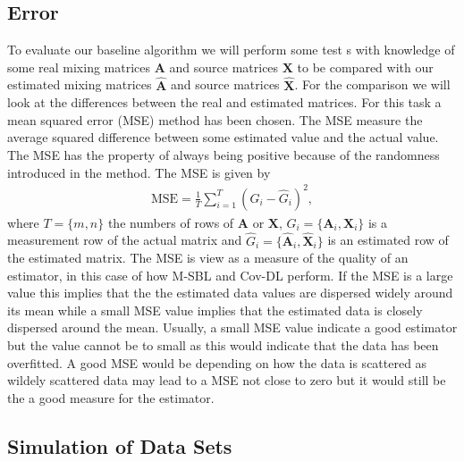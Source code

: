 \subsection{Error}
To evaluate our baseline algorithm we will perform some test s with knowledge of some real mixing matrices $\mathbf{A}$ and source matrices $\mathbf{X}$ to be compared with our estimated mixing matrices $\hat{\mathbf{A}}$ and source matrices $\hat{\mathbf{X}}$. For the comparison we will look at the differences between the real and estimated matrices. For this task a mean squared error (MSE) method has been chosen. The MSE measure the average squared difference between some estimated value and the actual value. The MSE has the property of always being positive because of the randomness introduced in the method.
The MSE is given by
\begin{align*}
\text{MSE} = \frac{1}{T} \sum_{i=1}^T (G_i - \hat{G}_i)^2,  
\end{align*}
where $T = \{m,n\}$ the numbers of rows of $\mathbf{A}$ or $\mathbf{X}$, $G_i = \{ \mathbf{A}_i, \mathbf{X}_i\}$ is a measurement row of the actual matrix and $\hat{G}_i = \{\hat{\mathbf{A}}_i,\hat{\mathbf{X}}_i\}$ is an estimated row of the estimated matrix.
The MSE is view as a measure of the quality of an estimator, in this case of how M-SBL and Cov-DL perform. 
If the MSE is a large value this implies that the the estimated data values are dispersed widely around its mean while a small MSE value implies that the estimated data is closely dispersed around the mean. Usually, a small MSE value indicate a good estimator but the value cannot be to small as this would indicate that the data has been overfitted. 
A good MSE would be depending on how the data is scattered as wildely scattered data may lead to a MSE not close to zero but it would still be the a good measure for the estimator.


\subsection{Simulation of Data Sets}


